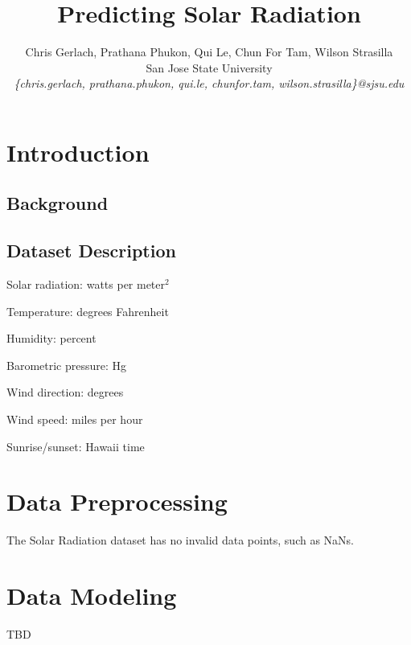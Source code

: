 \documentclass[conference]{IEEEtran}
\newcommand*{\affaddr}[1]{#1} %
\newcommand*{\email}[1]{\textit{#1}}
\begin{document}
\title{Predicting Solar Radiation}

\author{%
Chris Gerlach, Prathana Phukon, Qui Le, Chun For Tam, Wilson Strasilla\\

\affaddr{San Jose State University}\\

\email{\{chris.gerlach, prathana.phukon, qui.le, chunfor.tam, wilson.strasilla\}@sjsu.edu}\\
}

\IEEEoverridecommandlockouts
{}

\maketitle

\section{Introduction}

\subsection{Background}

\subsection{Dataset Description}

Solar radiation: watts per meter$^2$

Temperature: degrees Fahrenheit

Humidity: percent

Barometric pressure: Hg

Wind direction: degrees

Wind speed: miles per hour

Sunrise/sunset: Hawaii time

\section{Data Preprocessing}
\label{sec:dataset}
\quad The {\sc Solar Radiation} dataset has no invalid data points, such as NaNs.


\section{Data Modeling}
\label{sec:pre}
TBD
\end{document}
